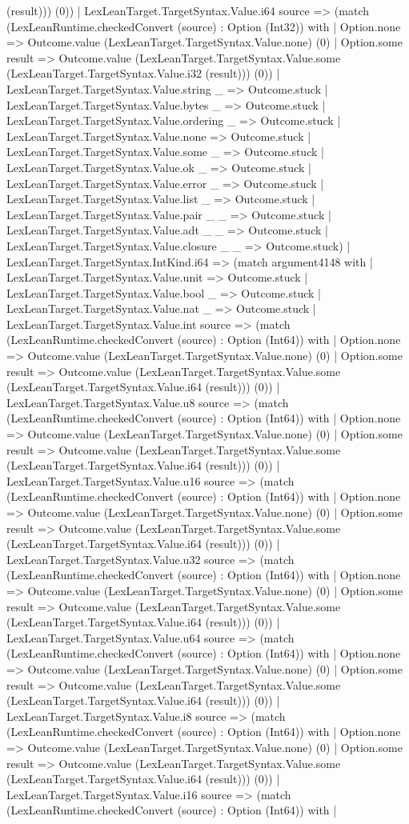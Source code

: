 \documentclass[11pt]{article}
\begin{document}
(result))) (0)) | LexLeanTarget.TargetSyntax.Value.i64 source => (match (LexLeanRuntime.checkedConvert (source) : Option (Int32)) with | Option.none => Outcome.value (LexLeanTarget.TargetSyntax.Value.none) (0) | Option.some result => Outcome.value (LexLeanTarget.TargetSyntax.Value.some (LexLeanTarget.TargetSyntax.Value.i32 (result))) (0)) | LexLeanTarget.TargetSyntax.Value.string \_ => Outcome.stuck | LexLeanTarget.TargetSyntax.Value.bytes \_ => Outcome.stuck | LexLeanTarget.TargetSyntax.Value.ordering \_ => Outcome.stuck | LexLeanTarget.TargetSyntax.Value.none => Outcome.stuck | LexLeanTarget.TargetSyntax.Value.some \_ => Outcome.stuck | LexLeanTarget.TargetSyntax.Value.ok \_ => Outcome.stuck | LexLeanTarget.TargetSyntax.Value.error \_ => Outcome.stuck | LexLeanTarget.TargetSyntax.Value.list \_ => Outcome.stuck | LexLeanTarget.TargetSyntax.Value.pair \_ \_ => Outcome.stuck | LexLeanTarget.TargetSyntax.Value.adt \_ \_ => Outcome.stuck | LexLeanTarget.TargetSyntax.Value.closure \_ \_ => Outcome.stuck) | LexLeanTarget.TargetSyntax.IntKind.i64 => (match argument4148 with | LexLeanTarget.TargetSyntax.Value.unit => Outcome.stuck | LexLeanTarget.TargetSyntax.Value.bool \_ => Outcome.stuck | LexLeanTarget.TargetSyntax.Value.nat \_ => Outcome.stuck | LexLeanTarget.TargetSyntax.Value.int source => (match (LexLeanRuntime.checkedConvert (source) : Option (Int64)) with | Option.none => Outcome.value (LexLeanTarget.TargetSyntax.Value.none) (0) | Option.some result => Outcome.value (LexLeanTarget.TargetSyntax.Value.some (LexLeanTarget.TargetSyntax.Value.i64 (result))) (0)) | LexLeanTarget.TargetSyntax.Value.u8 source => (match (LexLeanRuntime.checkedConvert (source) : Option (Int64)) with | Option.none => Outcome.value (LexLeanTarget.TargetSyntax.Value.none) (0) | Option.some result => Outcome.value (LexLeanTarget.TargetSyntax.Value.some (LexLeanTarget.TargetSyntax.Value.i64 (result))) (0)) | LexLeanTarget.TargetSyntax.Value.u16 source => (match (LexLeanRuntime.checkedConvert (source) : Option (Int64)) with | Option.none => Outcome.value (LexLeanTarget.TargetSyntax.Value.none) (0) | Option.some result => Outcome.value (LexLeanTarget.TargetSyntax.Value.some (LexLeanTarget.TargetSyntax.Value.i64 (result))) (0)) | LexLeanTarget.TargetSyntax.Value.u32 source => (match (LexLeanRuntime.checkedConvert (source) : Option (Int64)) with | Option.none => Outcome.value (LexLeanTarget.TargetSyntax.Value.none) (0) | Option.some result => Outcome.value (LexLeanTarget.TargetSyntax.Value.some (LexLeanTarget.TargetSyntax.Value.i64 (result))) (0)) | LexLeanTarget.TargetSyntax.Value.u64 source => (match (LexLeanRuntime.checkedConvert (source) : Option (Int64)) with | Option.none => Outcome.value (LexLeanTarget.TargetSyntax.Value.none) (0) | Option.some result => Outcome.value (LexLeanTarget.TargetSyntax.Value.some (LexLeanTarget.TargetSyntax.Value.i64 (result))) (0)) | LexLeanTarget.TargetSyntax.Value.i8 source => (match (LexLeanRuntime.checkedConvert (source) : Option (Int64)) with | Option.none => Outcome.value (LexLeanTarget.TargetSyntax.Value.none) (0) | Option.some result => Outcome.value (LexLeanTarget.TargetSyntax.Value.some (LexLeanTarget.TargetSyntax.Value.i64 (result))) (0)) | LexLeanTarget.TargetSyntax.Value.i16 source => (match (LexLeanRuntime.checkedConvert (source) : Option (Int64)) with | 
\end{document}

